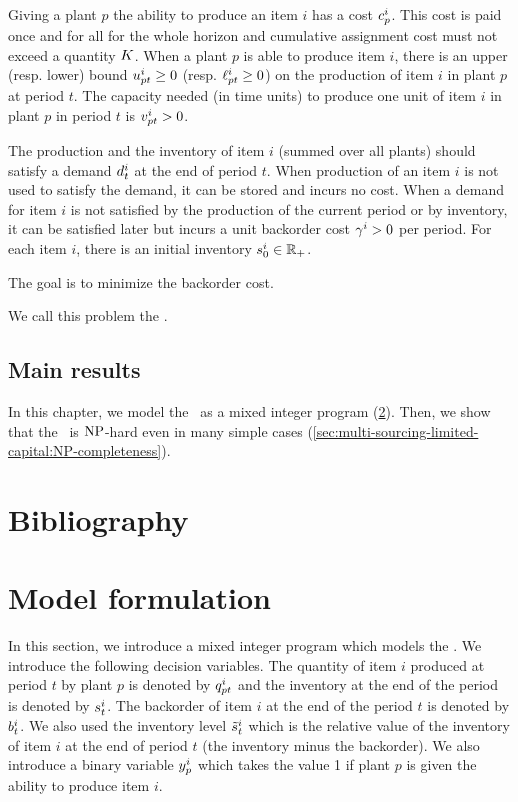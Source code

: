 Giving a plant $p$ the ability to produce an item $i$ has a cost $c_p^i$.
This cost is paid once and for all for the whole horizon and cumulative assignment cost must not exceed a quantity $K$.
When a plant $p$ is able to produce item $i$, there is an upper (resp. lower) bound $u_{pt}^i\ge 0$ (resp. $\ell_{pt}^i\ge 0$) on the production of item $i$ in plant $p$ at period $t$.
The capacity needed (in time units) to produce one unit of item $i$ in plant $p$ in period $t$ is $v_{pt}^i>0$.


The production and the inventory of item $i$ (summed over all plants) should satisfy a demand $d_t^i$ at the end of period $t$.
When production of an item $i$ is not used to satisfy the demand, it can be stored and incurs no cost.
When a demand for item $i$ is not satisfied by the production of the current period or by inventory, it can be satisfied later but incurs a unit backorder cost $\gamma^i>0$ per period.
For each item $i$, there is an initial inventory $s_0^i\in\mathbb{R}_+$.


The goal is to minimize the backorder cost.


We call this problem the \emph{\tbc}.



\subsection{Main results}


In this chapter, we model the \tbc\ as a mixed integer program (\cref{sec:multi-sourcing-limited-capital:model-formulation}).
Then, we show that the \tbc\ is $\operatorname{NP}$-hard even in many simple cases (\cref{sec:multi-sourcing-limited-capital:NP-completeness}).


\section{Bibliography}




\section{Model formulation}
\label{sec:multi-sourcing-limited-capital:model-formulation}


In this section, we introduce a mixed integer program which models the \tbc.
We introduce the following decision variables.
The quantity of item $i$ produced at period $t$ by plant $p$ is denoted by $q_{pt}^i$ and the inventory at the end of the period is denoted by $s_t^i$.
The backorder of item $i$ at the end of the period $t$ is denoted by $b_t^i$.
We also used the inventory level $\tilde{s}_t^i$ which is the relative value of the inventory of item $i$ at the end of period $t$ (\ie the inventory minus the backorder).
We also introduce a binary variable $y_p^i$ which takes the value 1 if plant $p$ is given the ability to produce item $i$.


